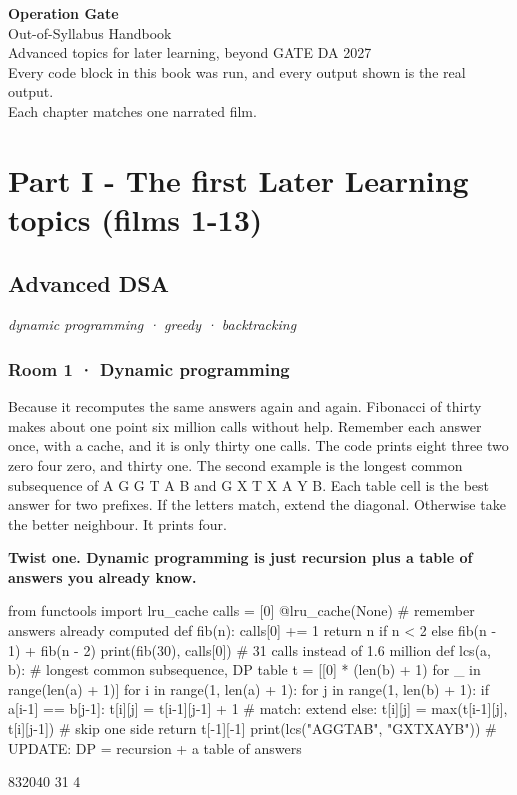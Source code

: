 \documentclass[11pt,a4paper]{report}
\begin{document}
\begin{titlepage}\centering\vspace*{3cm}
{\Huge\bfseries Operation Gate}\\[10pt]{\LARGE Out-of-Syllabus Handbook}\\[24pt]
{\large Advanced topics for later learning, beyond GATE DA 2027}\\[40pt]
Every code block in this book was run, and every output shown is the real output.\\[8pt]
Each chapter matches one narrated film.
\end{titlepage}
\tableofcontents
\part*{Part I - The first Later Learning topics (films 1-13)}
\chapter{Advanced DSA}
\textit{dynamic programming · greedy · backtracking}
\section*{Room 1 · Dynamic programming}
Because it recomputes the same answers again and again. Fibonacci of thirty makes about one point six million calls without help. Remember each answer once, with a cache, and it is only thirty one calls. The code prints eight three two zero four zero, and thirty one. The second example is the longest common subsequence of A G G T A B and G X T X A Y B. Each table cell is the best answer for two prefixes. If the letters match, extend the diagonal. Otherwise take the better neighbour. It prints four.
\begin{tcolorbox}[colback=yellow!12,colframe=orange!70!black,boxrule=0.4pt,left=4pt,right=4pt,top=2pt,bottom=2pt]\textbf{Twist one. Dynamic programming is just recursion plus a table of answers you already know.}\end{tcolorbox}
\begin{Code}
from functools import lru_cache
calls = [0]
@lru_cache(None)                           # remember answers already computed
def fib(n):
    calls[0] += 1
    return n if n < 2 else fib(n - 1) + fib(n - 2)
print(fib(30), calls[0])                   # 31 calls instead of 1.6 million
def lcs(a, b):                             # longest common subsequence, DP table
    t = [[0] * (len(b) + 1) for _ in range(len(a) + 1)]
    for i in range(1, len(a) + 1):
        for j in range(1, len(b) + 1):
            if a[i-1] == b[j-1]: t[i][j] = t[i-1][j-1] + 1      # match: extend
            else: t[i][j] = max(t[i-1][j], t[i][j-1])           # skip one side
    return t[-1][-1]
print(lcs("AGGTAB", "GXTXAYB"))
# UPDATE: DP = recursion + a table of answers
\end{Code}
\begin{Out}
832040 31
4
\end{Out}
\end{document}
